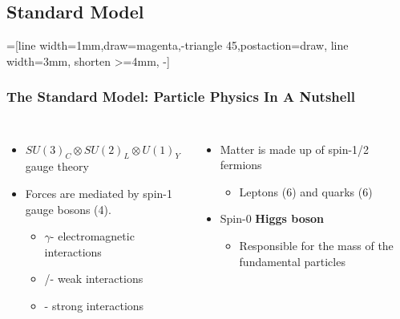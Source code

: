 

\subsection{Standard Model}


\begin{frame}[fragile]
	=[line width=1mm,draw=magenta,-triangle 45,postaction={draw, line width=3mm, shorten >=4mm, -}]
	\frametitle{The Standard Model: Particle Physics In A Nutshell}
	\vspace*{-0.24cm}
	\begin{block}{}
		\begin{columns}[t,onlytextwidth]
			\vspace*{-0.20cm}
			\begin{itemize}
				\small
				\item $SU(3)_{C}{\otimes}SU(2)_{L}{\otimes}U(1)_{Y}$ gauge theory
				\item Forces are mediated by spin-1 gauge bosons (4).
				\begin{itemize}
					\item $\gamma$\enspace- electromagnetic interactions
					\item \Wpm/\cPZ\enspace- weak interactions
					\item \cPg\enspace- strong interactions
				\end{itemize}
			\end{itemize}
			\begin{itemize}
				\vspace*{-0.20cm}
				\small
				\item Matter is made up of spin-1/2 fermions
				\begin{itemize}
					\item Leptons (6) and quarks (6)
				\end{itemize}
				\item Spin-0 \textbf{Higgs boson}
				\begin{itemize}
					\item Responsible for the mass of the fundamental particles
				\end{itemize}
			\end{itemize}

\end{columns}
\end{block}
\end{frame}

